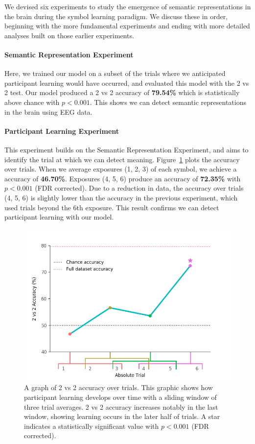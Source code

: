 \label{chapter:results}

We devised six experiments to study the emergence of semantic representations 
in the brain during the symbol learning paradigm. We discuss these in order, 
beginning with the more fundamental experiments and ending with more detailed 
analyses built on those earlier experiments.

%
  
\paragraph{Semantic Representation Experiment} Here, we trained our model on a 
subset of the trials where we anticipated participant learning would have 
occurred, and evaluated this model with the 2 vs 2 test. Our model produced a 2 
vs 2 accuracy of \textbf{79.54\%} which is statistically above chance with $p < 
0.001$. This shows we can detect semantic representations in the brain using 
EEG data.

\paragraph{Participant Learning Experiment} This experiment builds on the Semantic Representation Experiment, and aims to identify the trial at which we can detect meaning. Figure~\ref{fig:learning} plots the \tvt accuracy over trials. When we average exposures (1, 2, 3) of each symbol, we achieve a  \tvt accuracy of \textbf{46.70\%}. Exposures (4, 5, 6) produce an accuracy of \textbf{72.35\%} with $p < 0.001$ (FDR corrected). Due to a reduction in data, the \tvt accuracy over trials (4, 5, 6) is slightly lower than the \tvt accuracy in the previous experiment, which used trials beyond the 6th exposure. This result confirms we can detect participant learning with our model.

\begin{figure}[t]
  \centering
  \includegraphics[width=0.75\linewidth]{figures/learning}
  \caption{A graph of 2 vs 2 accuracy over trials. This graphic shows how participant learning develops over time with a sliding window of three trial averages. 2 vs 2 accuracy increases notably in the last window, showing learning occurs in the later half of trials. A star indicates a statistically significant value with $p < 0.001$ (FDR corrected).}
  \label{fig:learning}
\end{figure}

